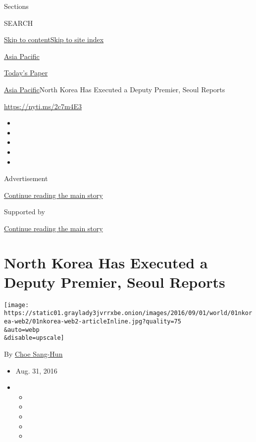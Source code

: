 Sections

SEARCH

\protect\hyperlink{site-content}{Skip to
content}\protect\hyperlink{site-index}{Skip to site index}

\href{https://www.nytimes3xbfgragh.onion/section/world/asia}{Asia
Pacific}

\href{https://myaccount.nytimes3xbfgragh.onion/auth/login?response_type=cookie\&client_id=vi}{}

\href{https://www.nytimes3xbfgragh.onion/section/todayspaper}{Today's
Paper}

\href{/section/world/asia}{Asia Pacific}\textbar{}North Korea Has
Executed a Deputy Premier, Seoul Reports

\url{https://nyti.ms/2c7m4E3}

\begin{itemize}
\item
\item
\item
\item
\item
\end{itemize}

Advertisement

\protect\hyperlink{after-top}{Continue reading the main story}

Supported by

\protect\hyperlink{after-sponsor}{Continue reading the main story}

\hypertarget{north-korea-has-executed-a-deputy-premier-seoul-reports}{%
\section{North Korea Has Executed a Deputy Premier, Seoul
Reports}\label{north-korea-has-executed-a-deputy-premier-seoul-reports}}

\texttt{[image: https://static01.graylady3jvrrxbe.onion/images/2016/09/01/world/01nkorea-web2/01nkorea-web2-articleInline.jpg?quality=75\\\&auto=webp\\\&disable=upscale]}

By \href{http://www.nytimes3xbfgragh.onion/by/choe-sang-hun}{Choe
Sang-Hun}

\begin{itemize}
\item
  Aug. 31, 2016
\item
  \begin{itemize}
  \item
  \item
  \item
  \item
  \item
  \end{itemize}
\end{itemize}

